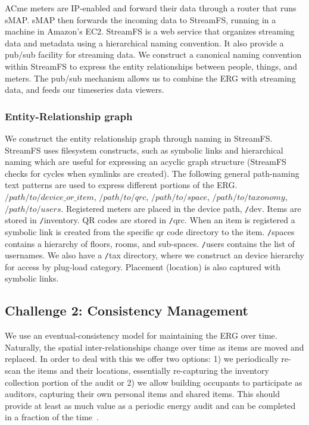 ACme meters are IP-enabled and forward their data through a router that runs sMAP.  sMAP then forwards the incoming data
to StreamFS, running in a machine in Amazon's EC2.  StreamFS is a web service that organizes streaming data and metadata using
a hierarchical naming convention.  It also provide a pub/sub facility for streaming data.  We construct 
a canonical naming convention within StreamFS to express the entity relationships between people, things, and meters.  The pub/sub
mechanism allows us to combine the ERG with streaming data, and feeds our timeseries data viewers.

\subsubsection{Entity-Relationship graph}
We construct the entity relationship graph through naming in StreamFS.  StreamFS uses filesystem constructs, such as symbolic
links and hierarchical naming which are useful for expressing an acyclic graph structure (StreamFS checks for cycles when symlinks 
are created).  
The following general path-naming text patterns are used to express different portions of the ERG.
$/path/to/device\_or\_item$, 
$/path/to/qrc$, $/path/to/space$, $/path/to/taxonomy$, $/path/to/users$.  
Registered meters are placed in the device path, {\texttt /dev}.  Items are stored in {\texttt /inventory}.  QR codes are stored 
in {\texttt /qrc}.  When an item is registered a 
symbolic link is created from the specific qr code directory to the item.  {\texttt /spaces} contains a hierarchy of floors, rooms, 
and sub-spaces.  {\texttt /users} contains the list of usernames.  We also have a {\texttt /tax} directory, where we construct an
device hierarchy for access by plug-load category.  Placement (location) is also captured with symbolic links. 

\subsection{Challenge 2: Consistency Management}
We use an eventual-consistency model for maintaining the ERG over time.  Naturally, the spatial inter-relationships
change over time as items are moved and replaced.  In order to deal with this we offer two options: 1) we periodically
re-scan the items and their locations, essentially re-capturing the inventory collection portion of the audit or
2) we allow building occupants to participate as auditors, capturing their own personal items and shared items.
This should provide at least as much value as a periodic energy audit and can be completed in a fraction of the 
time~\cite{aceee_mobileaudit}.

